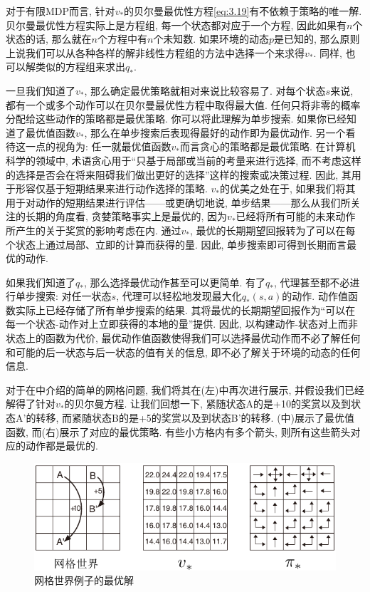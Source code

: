 对于有限MDP而言, 针对$v_*$的贝尔曼最优性方程\eqref{eq:3.19}有不依赖于策略的唯一解. 贝尔曼最优性方程实际上是方程组, 每一个状态都对应于一个方程, 因此如果有$n$个状态的话, 那么就在$n$个方程中有$n$个未知数. 如果环境的动态$p$是已知的, 那么原则上说我们可以从各种各样的解非线性方程组的方法中选择一个来求得$v_*$. 同样, 也可以解类似的方程组来求出$q_*$.

一旦我们知道了$v_*$, 那么确定最优策略就相对来说比较容易了. 对每个状态$s$来说, 都有一个或多个动作可以在贝尔曼最优性方程中取得最大值. 任何只将非零的概率分配给这些动作的策略都是最优策略. 你可以将此理解为单步搜索. 如果你已经知道了最优值函数$v_*$, 那么在单步搜索后表现得最好的动作即为最优动作. 另一个看待这一点的视角为: 任一就最优值函数$v_*$而言贪心的策略都是最优策略. 在计算机科学的领域中, 术语贪心用于``只基于局部或当前的考量来进行选择, 而不考虑这样的选择是否会在将来阻碍我们做出更好的选择''这样的搜索或决策过程. 因此, 其用于形容仅基于短期结果来进行动作选择的策略. $v_*$的优美之处在于, 如果我们将其用于对动作的短期结果进行评估——或更确切地说, 单步结果——那么从我们所关注的长期的角度看, 贪婪策略事实上是最优的, 因为$v_*$已经将所有可能的未来动作所产生的关于奖赏的影响考虑在内. 通过$v_*$, 最优的长期期望回报转为了可以在每个状态上通过局部、立即的计算而获得的量. 因此, 单步搜索即可得到长期而言最优的动作.

如果我们知道了$q_*$, 那么选择最优动作甚至可以更简单. 有了$q_*$, 代理甚至都不必进行单步搜索: 对任一状态$s$, 代理可以轻松地发现最大化$q_*(s, a)$的动作. 动作值函数实际上已经存储了所有单步搜索的结果. 其将最优的长期期望回报作为``可以在每一个状态-动作对上立即获得的本地的量''提供. 因此, 以构建动作-状态对上而非状态上的函数为代价, 最优动作值函数使得我们可以选择最优动作而不必了解任何和可能的后一状态与后一状态的值有关的信息, 即不必了解关于环境的动态的任何信息.

\begin{exam}[解决网格世界问题]
对于在中介绍的简单的网格问题, 我们将其在(左)中再次进行展示, 并假设我们已经解得了针对$v_*$的贝尔曼方程. 让我们回想一下, 紧随状态\textsf{A}的是+10的奖赏以及到状态\textsf{A'}的转移, 而紧随状态\textsf{B}的是+5的奖赏以及到状态\textsf{B'}的转移. (中)展示了最优值函数, 而(右)展示了对应的最优策略. 有些小方格内有多个箭头, 则所有这些箭头对应的动作都是最优的.
\begin{figure}[H]
\centering
\includegraphics[width=.8\textwidth]{c3/img/figure3-5.pdf}
\caption{网格世界例子的最优解}\label{fig:3.5}
\end{figure}
\vspace{-2em}
\end{exam}

